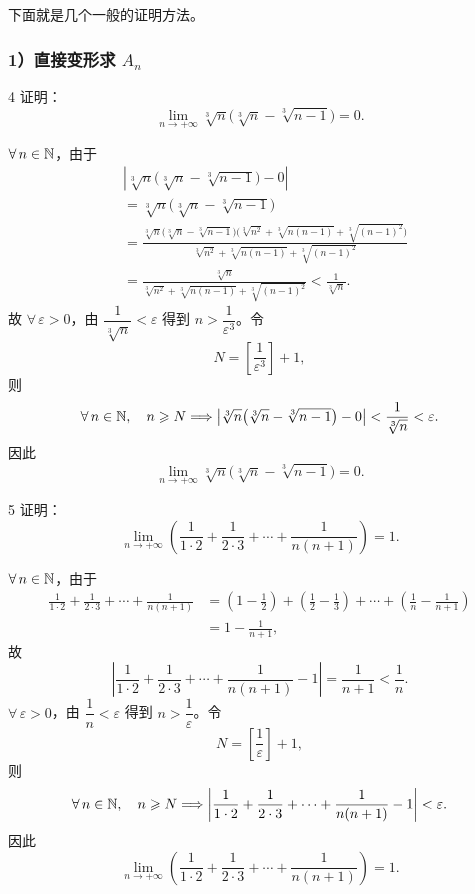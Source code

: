 下面就是几个一般的证明方法。

\subsubsection*{\texorpdfstring{1）直接变形求 \(A_n\)}{1）直接变形求 An}}

\begin{sourceexample}{4}
证明：
\[
\lim_{n\to+\infty}\sqrt[3]{n}\bigl(\sqrt[3]{n}-\sqrt[3]{n-1}\bigr)=0.
\]

\(\forall\,n\in\mathbb{N}\)，由于
\[
\begin{aligned}
&\left|\sqrt[3]{n}\bigl(\sqrt[3]{n}-\sqrt[3]{n-1}\bigr)-0\right|\\
&=\sqrt[3]{n}\bigl(\sqrt[3]{n}-\sqrt[3]{n-1}\bigr)\\
&=\frac{\sqrt[3]{n}\bigl(\sqrt[3]{n}-\sqrt[3]{n-1}\bigr)
\bigl(\sqrt[3]{n^2}+\sqrt[3]{n(n-1)}+\sqrt[3]{(n-1)^2}\bigr)}
{\sqrt[3]{n^2}+\sqrt[3]{n(n-1)}+\sqrt[3]{(n-1)^2}}\\
&=\frac{\sqrt[3]{n}}
{\sqrt[3]{n^2}+\sqrt[3]{n(n-1)}+\sqrt[3]{(n-1)^2}}
<\frac1{\sqrt[3]{n}}.
\end{aligned}
\]
故 \(\forall\,\varepsilon>0\)，由 \(\dfrac1{\sqrt[3]{n}}<\varepsilon\) 得到
\(n>\dfrac1{\varepsilon^3}\)。令
\[
N=\left[\frac1{\varepsilon^3}\right]+1,
\]
则
\[
\forall\,n\in\mathbb{N},\quad n\geqslant N
\Longrightarrow
\left|\sqrt[3]{n}\bigl(\sqrt[3]{n}-\sqrt[3]{n-1}\bigr)-0\right|
<\frac1{\sqrt[3]{n}}<\varepsilon.
\]
因此
\[
\lim_{n\to+\infty}\sqrt[3]{n}\bigl(\sqrt[3]{n}-\sqrt[3]{n-1}\bigr)=0.
\]
\end{sourceexample}

\begin{sourceexample}{5}
证明：
\[
\lim_{n\to+\infty}
\left(\frac1{1\cdot2}+\frac1{2\cdot3}+\cdots+\frac1{n(n+1)}\right)=1.
\]

\(\forall\,n\in\mathbb{N}\)，由于
\[
\begin{aligned}
\frac1{1\cdot2}+\frac1{2\cdot3}+\cdots+\frac1{n(n+1)}
&=\left(1-\frac12\right)+\left(\frac12-\frac13\right)
 +\cdots+\left(\frac1n-\frac1{n+1}\right)\\
&=1-\frac1{n+1},
\end{aligned}
\]
故
\[
\left|
\frac1{1\cdot2}+\frac1{2\cdot3}+\cdots+\frac1{n(n+1)}-1
\right|
=\frac1{n+1}<\frac1n.
\]
\(\forall\,\varepsilon>0\)，由 \(\dfrac1n<\varepsilon\) 得到
\(n>\dfrac1\varepsilon\)。令
\[
N=\left[\frac1\varepsilon\right]+1,
\]
则
\[
\forall\,n\in\mathbb{N},\quad n\geqslant N
\Longrightarrow
\left|
\frac1{1\cdot2}+\frac1{2\cdot3}+\cdots+\frac1{n(n+1)}-1
\right|<\varepsilon.
\]
因此
\[
\lim_{n\to+\infty}
\left(\frac1{1\cdot2}+\frac1{2\cdot3}+\cdots+\frac1{n(n+1)}\right)=1.
\]
\end{sourceexample}

